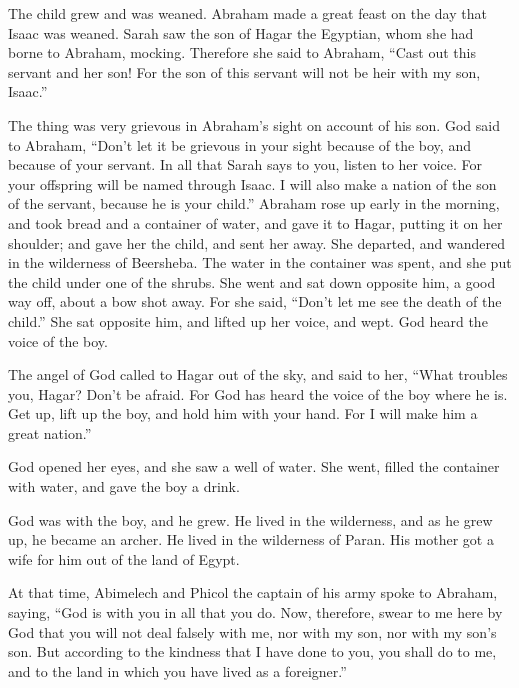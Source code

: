  The child grew and was weaned. Abraham made a great feast
on the day that Isaac was weaned.  Sarah saw the son of
Hagar the Egyptian, whom she had borne to Abraham, mocking.
 Therefore she said to Abraham, ``Cast out this servant and
her son! For the son of this servant will not be heir with my son,
Isaac.''

 The thing was very grievous in Abraham's sight on account
of his son.  God said to Abraham, ``Don't let it be
grievous in your sight because of the boy, and because of your servant.
In all that Sarah says to you, listen to her voice. For your offspring
will be named through Isaac.  I will also make a nation of
the son of the servant, because he is your child.'' 
Abraham rose up early in the morning, and took bread and a container of
water, and gave it to Hagar, putting it on her shoulder; and gave her
the child, and sent her away. She departed, and wandered in the
wilderness of Beersheba.  The water in the container was
spent, and she put the child under one of the shrubs.  She
went and sat down opposite him, a good way off, about a bow shot away.
For she said, ``Don't let me see the death of the child.'' She sat
opposite him, and lifted up her voice, and wept.  God heard
the voice of the boy.

The angel of God called to Hagar out of the sky, and said to her, ``What
troubles you, Hagar? Don't be afraid. For God has heard the voice of the
boy where he is.  Get up, lift up the boy, and hold him
with your hand. For I will make him a great nation.''

 God opened her eyes, and she saw a well of water. She
went, filled the container with water, and gave the boy a drink.

 God was with the boy, and he grew. He lived in the
wilderness, and as he grew up, he became an archer.  He
lived in the wilderness of Paran. His mother got a wife for him out of
the land of Egypt.

 At that time, Abimelech and Phicol the captain of his army
spoke to Abraham, saying, ``God is with you in all that you do.
 Now, therefore, swear to me here by God that you will not
deal falsely with me, nor with my son, nor with my son's son. But
according to the kindness that I have done to you, you shall do to me,
and to the land in which you have lived as a foreigner.''

